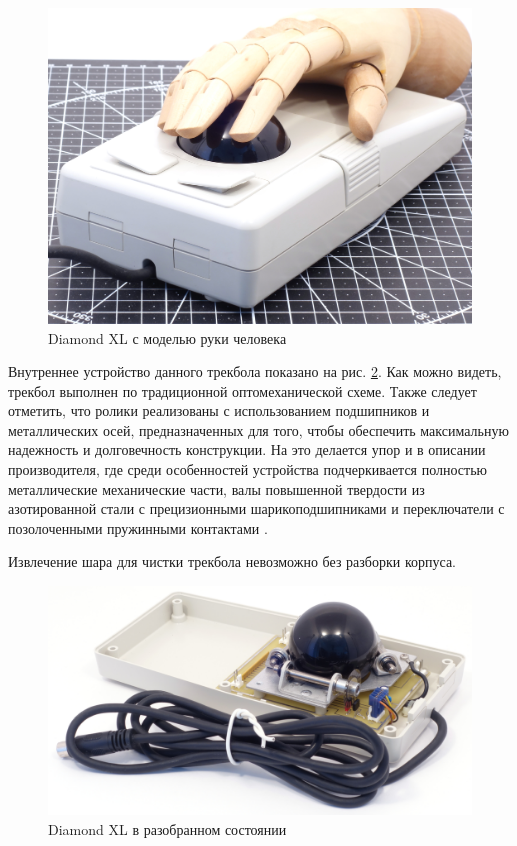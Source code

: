 \documentclass[11pt, a4paper]{article}
\begin{document}
\begin{figure}[h]
    \centering
    \includegraphics[scale=0.4]{1993_evergreen_diamond_xl_trackball/hand_30.jpg}
    \caption{Diamond XL с моделью руки человека}
    \label{fig:DiamondXLHand}
\end{figure}

Внутреннее устройство данного трекбола показано на рис. \ref{fig:DiamondXLInside}. Как можно видеть,  трекбол выполнен по традиционной оптомеханической схеме. Также следует отметить, что ролики реализованы с использованием подшипников и металлических осей, предназначенных для того, чтобы обеспечить максимальную надежность и долговечность конструкции. На это делается упор и в описании производителя, где среди особенностей устройства подчеркивается полностью металлические механические части, валы повышенной твердости из азотированной стали с прецизионными шарикоподшипниками и переключатели с позолоченными пружинными контактами \cite{dtxl3}.

Извлечение шара для чистки трекбола невозможно без разборки корпуса.

\begin{figure}[h]
    \centering
    \includegraphics[scale=0.4]{1993_evergreen_diamond_xl_trackball/inside_30.jpg}
    \caption{Diamond XL в разобранном состоянии}
    \label{fig:DiamondXLInside}
\end{figure}
\end{document}
